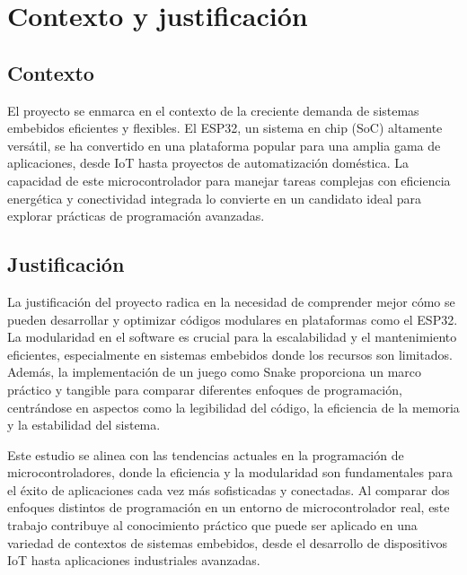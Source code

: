 \section{Contexto y justificación}

\subsection{Contexto}
El proyecto se enmarca en el contexto de la creciente demanda de sistemas embebidos eficientes y flexibles. El ESP32, un sistema en chip (SoC) altamente versátil, se ha convertido en una plataforma popular para una amplia gama de aplicaciones, desde IoT hasta proyectos de automatización doméstica. La capacidad de este microcontrolador para manejar tareas complejas con eficiencia energética y conectividad integrada lo convierte en un candidato ideal para explorar prácticas de programación avanzadas.


\subsection{Justificación}
La justificación del proyecto radica en la necesidad de comprender mejor cómo se pueden desarrollar y optimizar códigos modulares en plataformas como el ESP32. La modularidad en el software es crucial para la escalabilidad y el mantenimiento eficientes, especialmente en sistemas embebidos donde los recursos son limitados. Además, la implementación de un juego como Snake proporciona un marco práctico y tangible para comparar diferentes enfoques de programación, centrándose en aspectos como la legibilidad del código, la eficiencia de la memoria y la estabilidad del sistema.

Este estudio se alinea con las tendencias actuales en la programación de microcontroladores, donde la eficiencia y la modularidad son fundamentales para el éxito de aplicaciones cada vez más sofisticadas y conectadas. Al comparar dos enfoques distintos de programación en un entorno de microcontrolador real, este trabajo contribuye al conocimiento práctico que puede ser aplicado en una variedad de contextos de sistemas embebidos, desde el desarrollo de dispositivos IoT hasta aplicaciones industriales avanzadas.